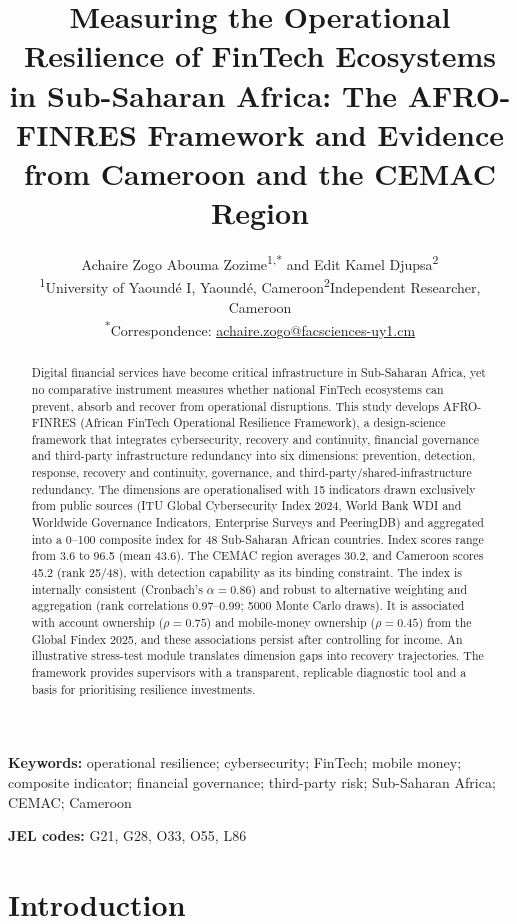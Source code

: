 \documentclass[11pt,a4paper]{article}
\title{\textbf{Measuring the Operational Resilience of FinTech Ecosystems in Sub-Saharan Africa: The AFRO-FINRES Framework and Evidence from Cameroon and the CEMAC Region}}
\author{Achaire Zogo Abouma Zozime\textsuperscript{1,*} and Edit Kamel Djupsa\textsuperscript{2}\\[2pt]
\small \textsuperscript{1}University of Yaound\'e I, Yaound\'e, Cameroon\quad \textsuperscript{2}Independent Researcher, Cameroon\\
\small \textsuperscript{*}Correspondence: \href{mailto:achaire.zogo@facsciences-uy1.cm}{achaire.zogo@facsciences-uy1.cm}}
\date{}
\begin{document}
\maketitle

\begin{abstract}
\noindent
Digital financial services have become critical infrastructure in Sub-Saharan Africa, yet no comparative instrument measures whether national FinTech ecosystems can prevent, absorb and recover from operational disruptions. This study develops AFRO-FINRES (African FinTech Operational Resilience Framework), a design-science framework that integrates cybersecurity, recovery and continuity, financial governance and third-party infrastructure redundancy into six dimensions: prevention, detection, response, recovery and continuity, governance, and third-party/shared-infrastructure redundancy. The dimensions are operationalised with 15 indicators drawn exclusively from public sources (ITU Global Cybersecurity Index 2024, World Bank WDI and Worldwide Governance Indicators, Enterprise Surveys and PeeringDB) and aggregated into a 0--100 composite index for 48 Sub-Saharan African countries. Index scores range from 3.6 to 96.5 (mean 43.6). The CEMAC region averages 30.2, and Cameroon scores 45.2 (rank 25/48), with detection capability as its binding constraint. The index is internally consistent (Cronbach's $\alpha=0.86$) and robust to alternative weighting and aggregation (rank correlations 0.97--0.99; 5000 Monte Carlo draws). It is associated with account ownership ($\rho=0.75$) and mobile-money ownership ($\rho=0.45$) from the Global Findex 2025, and these associations persist after controlling for income. An illustrative stress-test module translates dimension gaps into recovery trajectories. The framework provides supervisors with a transparent, replicable diagnostic tool and a basis for prioritising resilience investments.
\end{abstract}

\noindent\textbf{Keywords:} operational resilience; cybersecurity; FinTech; mobile money; composite indicator; financial governance; third-party risk; Sub-Saharan Africa; CEMAC; Cameroon

\noindent\textbf{JEL codes:} G21, G28, O33, O55, L86

\section{Introduction}
\end{document}
